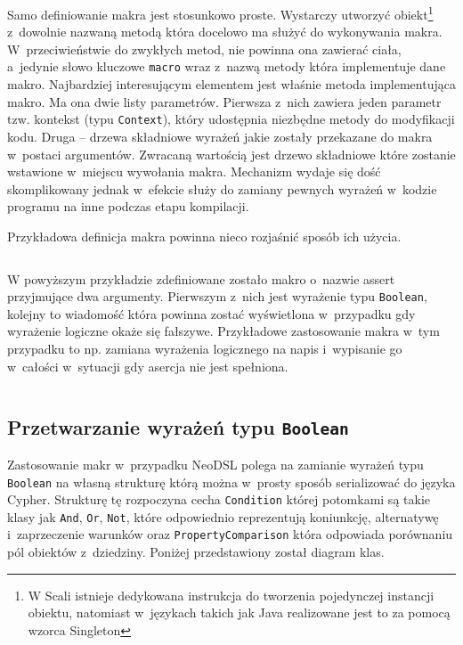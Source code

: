 \documentclass[brudnopis]{xmgr}
\begin{document}
Samo definiowanie makra jest stosunkowo proste. Wystarczy utworzyć obiekt\footnote{W Scali istnieje dedykowana instrukcja do tworzenia pojedynczej instancji obiektu, natomiast w~językach takich jak Java realizowane jest to za pomocą wzorca Singleton} z~dowolnie nazwaną metodą która docelowo ma służyć do wykonywania makra. W~przeciwieństwie do zwykłych metod, nie powinna ona zawierać ciała, a~jedynie słowo kluczowe \texttt{macro} wraz z~nazwą metody która implementuje dane makro. Najbardziej interesującym elementem jest właśnie metoda implementująca makro. Ma ona dwie listy parametrów. Pierwsza z~nich zawiera jeden parametr tzw. kontekst (typu \texttt{Context}), który udostępnia niezbędne metody do modyfikacji kodu. Druga --  drzewa składniowe wyrażeń jakie zostały przekazane do makra w~postaci argumentów. Zwracaną wartością jest drzewo składniowe które zostanie wstawione w~miejscu wywołania makra. Mechanizm wydaje się dość skomplikowany jednak w~efekcie służy do zamiany pewnych wyrażeń w~kodzie programu na inne podczas etapu kompilacji.

\medskip\noindent Przykładowa definicja makra powinna nieco rozjaśnić sposób ich użycia.

\inputminted{scala}{listings/scala/macro-sample.scala}

W powyższym przykładzie zdefiniowane zostało makro o~nazwie assert przyjmujące dwa argumenty. Pierwszym z~nich jest wyrażenie typu \texttt{Boolean}, kolejny to wiadomość która powinna zostać wyświetlona w~przypadku gdy wyrażenie logiczne okaże się fałszywe. Przykładowe zastosowanie makra w~tym przypadku to np. zamiana wyrażenia logicznego na napis i~wypisanie go w~całości w~sytuacji gdy asercja nie jest spełniona.

\inputminted{scala}{listings/scala/macro-usage-assert.scala}

\newpage

\subsection{Przetwarzanie wyrażeń typu \texttt{Boolean}}

Zastosowanie makr w~przypadku NeoDSL polega na zamianie wyrażeń typu \texttt{Boolean} na własną strukturę którą można w~prosty sposób serializować do języka Cypher. 
Strukturę tę rozpoczyna cecha \texttt{Condition} której potomkami są takie klasy jak \texttt{And}, \texttt{Or}, \texttt{Not}, które odpowiednio reprezentują koniunkcję, alternatywę i~zaprzeczenie warunków oraz \texttt{PropertyComparison} która odpowiada porównaniu pól obiektów z~dziedziny. Poniżej przedstawiony został diagram klas.
\end{document}
